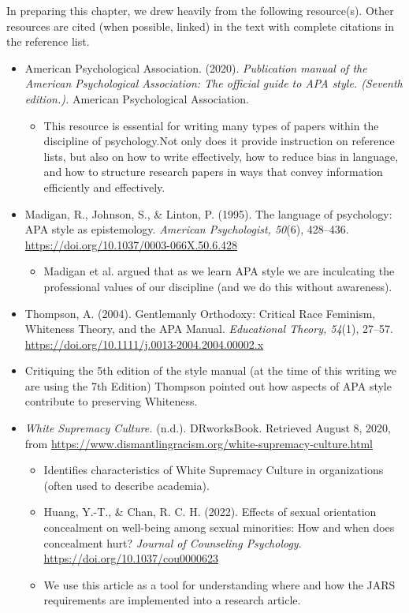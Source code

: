 \documentclass[
  11pt,
]{book}
\providecommand{\tightlist}{%
  \setlength{\itemsep}{0pt}\setlength{\parskip}{0pt}}
\begin{document}
In preparing this chapter, we drew heavily from the following resource(s). Other resources are cited (when possible, linked) in the text with complete citations in the reference list.

\begin{itemize}
\tightlist
\item
  American Psychological Association. (2020). \emph{Publication manual of the American Psychological Association: The official guide to APA style. (Seventh edition.).} American Psychological Association.

  \begin{itemize}
  \tightlist
  \item
    This resource is essential for writing many types of papers within the discipline of psychology.Not only does it provide instruction on reference lists, but also on how to write effectively, how to reduce bias in language, and how to structure research papers in ways that convey information efficiently and effectively.
  \end{itemize}
\item
  Madigan, R., Johnson, S., \& Linton, P. (1995). The language of psychology: APA style as epistemology. \emph{American Psychologist, 50}(6), 428--436. \url{https://doi.org/10.1037/0003-066X.50.6.428}

  \begin{itemize}
  \tightlist
  \item
    Madigan et al. \citeyearpar{madigan_language_1995} argued that as we learn APA style we are inculcating the professional values of our discipline (and we do this without awareness).
  \end{itemize}
\item
  Thompson, A. (2004). Gentlemanly Orthodoxy: Critical Race Feminism, Whiteness Theory, and the APA Manual. \emph{Educational Theory, 54}(1), 27--57. \url{https://doi.org/10.1111/j.0013-2004.2004.00002.x}
\item
  Critiquing the 5th edition of the style manual (at the time of this writing we are using the 7th Edition) Thompson \citeyearpar{thompson_gentlemanly_2004} pointed out how aspects of APA style contribute to preserving Whiteness.
\item
  \emph{White Supremacy Culture.} (n.d.). DRworksBook. Retrieved August 8, 2020, from \url{https://www.dismantlingracism.org/white-supremacy-culture.html}

  \begin{itemize}
  \tightlist
  \item
    Identifies characteristics of White Supremacy Culture in organizations (often used to describe academia).
  \item
    Huang, Y.-T., \& Chan, R. C. H. (2022). Effects of sexual orientation concealment on well-being among sexual minorities: How and when does concealment hurt? \emph{Journal of Counseling Psychology}. \url{https://doi.org/10.1037/cou0000623}
  \item
    We use this article as a tool for understanding where and how the JARS requirements are implemented into a research article.
  \end{itemize}
\end{itemize}
\end{document}
